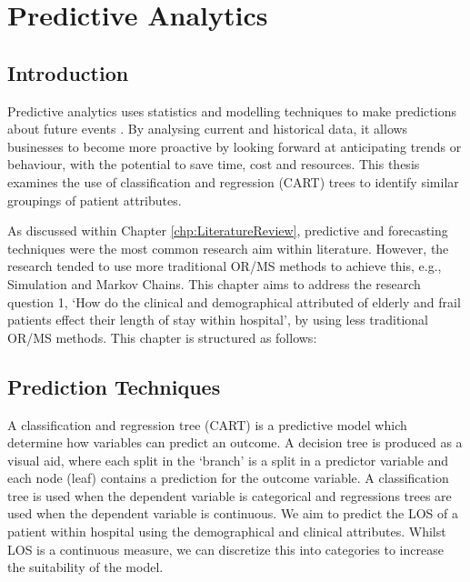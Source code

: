 \documentclass[../thesis.tex]{subfiles}
\begin{document}
\chapter{Predictive Analytics}
\section{Introduction}
Predictive analytics uses statistics and modelling techniques to make predictions about future events \cite{Kumar2018}. By analysing current and historical data, it allows businesses to become more proactive by looking forward at anticipating trends or behaviour, with the potential to save time, cost and resources. This thesis examines the use of classification and regression (CART) trees to identify similar groupings of patient attributes.%

As discussed within Chapter \ref{chp:LiteratureReview}, predictive and forecasting techniques were the most common research aim within literature. However, the research tended to use more traditional OR/MS methods to achieve this, e.g., Simulation and Markov Chains. This chapter aims to address the research question 1, `How do the clinical and demographical attributed of elderly and frail patients effect their length of stay within hospital', by using less traditional OR/MS methods. This chapter is structured as follows:



\section{Prediction Techniques}
A classification and regression tree (CART) is a predictive model which determine how variables can predict an outcome. A decision tree is produced as a visual aid, where each split in the ‘branch’ is a split in a predictor variable and each node (leaf) contains a prediction for the outcome variable. A classification tree is used when the dependent variable is categorical and regressions trees are used when the dependent variable is continuous. We aim to predict the LOS of a patient within hospital using the demographical and clinical attributes. Whilst LOS is a continuous measure, we can discretize this into categories to increase the suitability of the model. 
\end{document}
